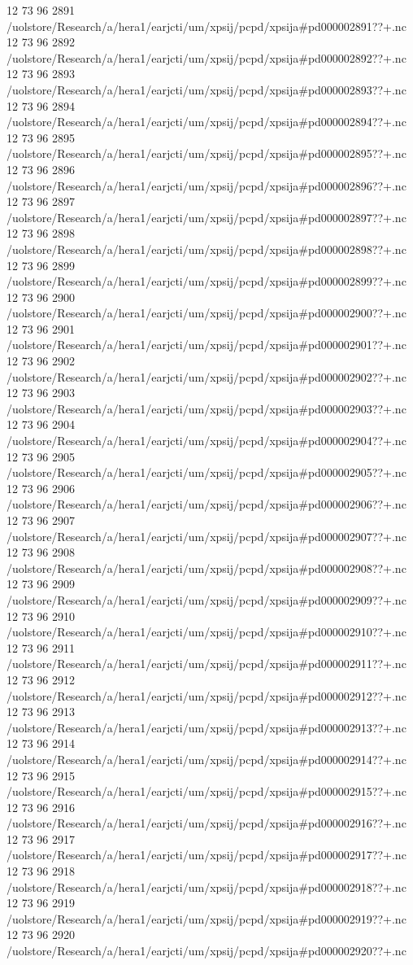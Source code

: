 12 73 96
2891
/uolstore/Research/a/hera1/earjcti/um/xpsij/pcpd/xpsija#pd000002891??+.nc
12 73 96
2892
/uolstore/Research/a/hera1/earjcti/um/xpsij/pcpd/xpsija#pd000002892??+.nc
12 73 96
2893
/uolstore/Research/a/hera1/earjcti/um/xpsij/pcpd/xpsija#pd000002893??+.nc
12 73 96
2894
/uolstore/Research/a/hera1/earjcti/um/xpsij/pcpd/xpsija#pd000002894??+.nc
12 73 96
2895
/uolstore/Research/a/hera1/earjcti/um/xpsij/pcpd/xpsija#pd000002895??+.nc
12 73 96
2896
/uolstore/Research/a/hera1/earjcti/um/xpsij/pcpd/xpsija#pd000002896??+.nc
12 73 96
2897
/uolstore/Research/a/hera1/earjcti/um/xpsij/pcpd/xpsija#pd000002897??+.nc
12 73 96
2898
/uolstore/Research/a/hera1/earjcti/um/xpsij/pcpd/xpsija#pd000002898??+.nc
12 73 96
2899
/uolstore/Research/a/hera1/earjcti/um/xpsij/pcpd/xpsija#pd000002899??+.nc
12 73 96
2900
/uolstore/Research/a/hera1/earjcti/um/xpsij/pcpd/xpsija#pd000002900??+.nc
12 73 96
2901
/uolstore/Research/a/hera1/earjcti/um/xpsij/pcpd/xpsija#pd000002901??+.nc
12 73 96
2902
/uolstore/Research/a/hera1/earjcti/um/xpsij/pcpd/xpsija#pd000002902??+.nc
12 73 96
2903
/uolstore/Research/a/hera1/earjcti/um/xpsij/pcpd/xpsija#pd000002903??+.nc
12 73 96
2904
/uolstore/Research/a/hera1/earjcti/um/xpsij/pcpd/xpsija#pd000002904??+.nc
12 73 96
2905
/uolstore/Research/a/hera1/earjcti/um/xpsij/pcpd/xpsija#pd000002905??+.nc
12 73 96
2906
/uolstore/Research/a/hera1/earjcti/um/xpsij/pcpd/xpsija#pd000002906??+.nc
12 73 96
2907
/uolstore/Research/a/hera1/earjcti/um/xpsij/pcpd/xpsija#pd000002907??+.nc
12 73 96
2908
/uolstore/Research/a/hera1/earjcti/um/xpsij/pcpd/xpsija#pd000002908??+.nc
12 73 96
2909
/uolstore/Research/a/hera1/earjcti/um/xpsij/pcpd/xpsija#pd000002909??+.nc
12 73 96
2910
/uolstore/Research/a/hera1/earjcti/um/xpsij/pcpd/xpsija#pd000002910??+.nc
12 73 96
2911
/uolstore/Research/a/hera1/earjcti/um/xpsij/pcpd/xpsija#pd000002911??+.nc
12 73 96
2912
/uolstore/Research/a/hera1/earjcti/um/xpsij/pcpd/xpsija#pd000002912??+.nc
12 73 96
2913
/uolstore/Research/a/hera1/earjcti/um/xpsij/pcpd/xpsija#pd000002913??+.nc
12 73 96
2914
/uolstore/Research/a/hera1/earjcti/um/xpsij/pcpd/xpsija#pd000002914??+.nc
12 73 96
2915
/uolstore/Research/a/hera1/earjcti/um/xpsij/pcpd/xpsija#pd000002915??+.nc
12 73 96
2916
/uolstore/Research/a/hera1/earjcti/um/xpsij/pcpd/xpsija#pd000002916??+.nc
12 73 96
2917
/uolstore/Research/a/hera1/earjcti/um/xpsij/pcpd/xpsija#pd000002917??+.nc
12 73 96
2918
/uolstore/Research/a/hera1/earjcti/um/xpsij/pcpd/xpsija#pd000002918??+.nc
12 73 96
2919
/uolstore/Research/a/hera1/earjcti/um/xpsij/pcpd/xpsija#pd000002919??+.nc
12 73 96
2920
/uolstore/Research/a/hera1/earjcti/um/xpsij/pcpd/xpsija#pd000002920??+.nc
